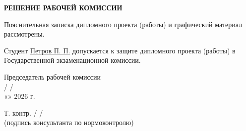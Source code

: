 \thispagestyle{empty}

\vspace*{2cm} %

\begin{center}
    {\bfseries РЕШЕНИЕ РАБОЧЕЙ КОМИССИИ}
\end{center}

\vspace{1cm}

\noindent Пояснительная записка дипломного проекта (работы) и графический материал рассмотрены. 

\vspace{0.5cm}

\noindent Студент \underline{Петров П. П.} %
допускается к защите дипломного проекта (работы) в Государственной экзаменационной комиссии.

\vspace{1.5cm}

\begin{flushright}
    \begin{minipage}{0.6\textwidth}
        Председатель рабочей комиссии \\
        \underline{\hspace{4cm}} / \underline{\hspace{3cm}} / \\
        \vspace{0.2cm}
        «\underline{\hspace{1cm}}» \underline{\hspace{3cm}} 2026 г.
    \end{minipage}
\end{flushright}

\vfill

\begin{flushleft}
    \begin{minipage}{0.5\textwidth}
        Т. контр. \underline{\hspace{3cm}} / \underline{\hspace{3cm}} / \\
        \small (подпись консультанта по нормоконтролю)
    \end{minipage}
\end{flushleft}

\newpage